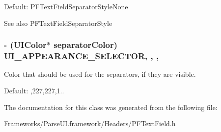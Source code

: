 Default\+: {\ttfamily P\+F\+Text\+Field\+Separator\+Style\+None}

\begin{DoxySeeAlso}{See also}
P\+F\+Text\+Field\+Separator\+Style 
\end{DoxySeeAlso}
\hypertarget{interface_p_f_text_field_a5c0195a8802ca92af06f63762a1093c0}{}
\subsubsection[{U\+I\+\_\+\+A\+P\+P\+E\+A\+R\+A\+N\+C\+E\+\_\+\+S\+E\+L\+E\+C\+T\+O\+R}]{\setlength{\rightskip}{0pt plus 5cm}-\/ (U\+I\+Color$\ast$ separator\+Color) U\+I\+\_\+\+A\+P\+P\+E\+A\+R\+A\+N\+C\+E\+\_\+\+S\+E\+L\+E\+C\+T\+O\+R\hspace{0.3cm}{\ttfamily [read]}, {\ttfamily [write]}, {\ttfamily [nonatomic]}, {\ttfamily [strong]}}\label{interface_p_f_text_field_a5c0195a8802ca92af06f63762a1093c0}
Color that should be used for the separators, if they are visible.

Default\+: {,227,227,1.}. 

The documentation for this class was generated from the following file\+:\begin{DoxyCompactItemize}
\item 
Frameworks/\+Parse\+U\+I.\+framework/\+Headers/P\+F\+Text\+Field.\+h\end{DoxyCompactItemize}
